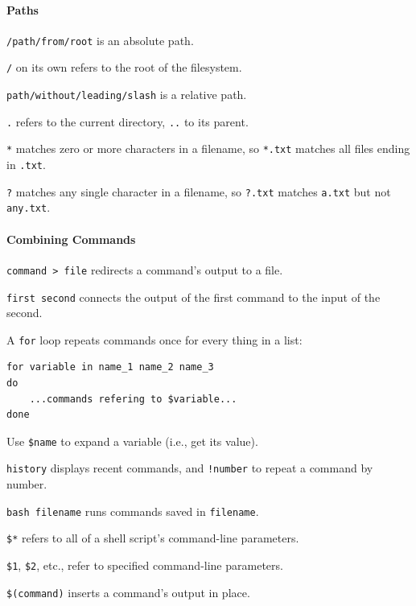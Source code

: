 \documentclass{book}
\begin{document}
\mbox{}\paragraph{Paths}

\begin{swcitemize}
\item
  \texttt{/path/from/root} is an absolute path.
\item
  \texttt{/} on its own refers to the root of the filesystem.
\item
  \texttt{path/without/leading/slash} is a relative path.
\item
  \texttt{.} refers to the current directory, \texttt{..} to its parent.
\item
  \texttt{*} matches zero or more characters in a filename, so
  \texttt{*.txt} matches all files ending in \texttt{.txt}.
\item
  \texttt{?} matches any single character in a filename, so
  \texttt{?.txt} matches \texttt{a.txt} but not \texttt{any.txt}.
\end{swcitemize}

\mbox{}\paragraph{Combining Commands}

\begin{swcitemize}
\item
  \texttt{command \textgreater{} file} redirects a command's output to a
  file.
\item
  \texttt{first \textbar{} second} connects the output of the first
  command to the input of the second.
\item
  A \texttt{for} loop repeats commands once for every thing in a list:

\begin{verbatim}
for variable in name_1 name_2 name_3
do
    ...commands refering to $variable...
done
\end{verbatim}
\item
  Use \texttt{\$name} to expand a variable (i.e., get its value).
\item
  \texttt{history} displays recent commands, and \texttt{!number} to
  repeat a command by number.
\item
  \texttt{bash filename} runs commands saved in \texttt{filename}.
\item
  \texttt{\$*} refers to all of a shell script's command-line
  parameters.
\item
  \texttt{\$1}, \texttt{\$2}, etc., refer to specified command-line
  parameters.
\item
  \texttt{\$(command)} inserts a command's output in place.
\end{swcitemize}
\end{document}
